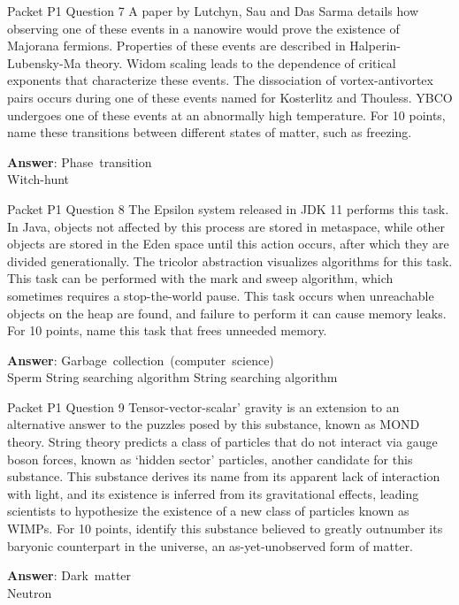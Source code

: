 \begin{frame}{Packet P1 Question 7}
A paper by Lutchyn, Sau and Das Sarma details how observing one of these events in a nanowire would prove the existence of Majorana fermions. Properties of these events are described in Halperin-Lubensky-Ma theory. Widom scaling leads to the dependence of critical exponents that characterize these events. The dissociation of vortex-antivortex pairs occurs during one of these events named for Kosterlitz and Thouless. YBCO     undergoes one of these events at an abnormally high temperature. For 10 points, name these transitions between different states of matter, such as freezing.    

\textbf{Answer}: Phase\ transition\\
 Witch-hunt
\end{frame}

\begin{frame}{Packet P1 Question 8}
The Epsilon system released in JDK 11 performs this task. In Java, objects not affected by this process are stored in metaspace,   while other objects are stored in the Eden space until this action occurs, after which they are divided generationally. The tricolor abstraction visualizes algorithms for this   task. This task can be performed with the mark and sweep   algorithm, which sometimes requires a stop-the-world pause. This task occurs when unreachable objects on the heap are found, and failure to perform it can cause memory leaks. For 10 points, name this task that frees unneeded     memory.  

\textbf{Answer}: Garbage\ collection\ (computer\ science)\\
 Sperm
 String searching algorithm
 String searching algorithm
\end{frame}

\begin{frame}{Packet P1 Question 9}
Tensor-vector-scalar' gravity is an extension to an alternative answer to the puzzles posed by this substance, known as MOND theory. String theory predicts a class of particles that do not interact via gauge boson forces, known as `hidden sector' particles, another candidate for this substance. This substance derives its name from its apparent lack of interaction with light, and its existence is inferred from its gravitational effects, leading scientists to hypothesize the existence of a new class of particles known as WIMPs. For 10 points,   identify this substance   believed to greatly outnumber its baryonic counterpart   in the universe, an as-yet-unobserved form of matter.  

\textbf{Answer}: Dark\ matter\\
 Neutron
\end{frame}

